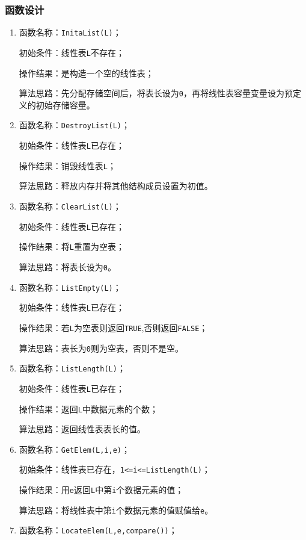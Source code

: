 \documentclass[supercite]{Experimental_Report}
\theoremstyle{definition}
\begin{document}
\subsubsection{函数设计}
\begin{enumerate}
\item 函数名称：\verb|InitaList(L)|；

初始条件：线性表\verb|L|不存在；

操作结果：是构造一个空的线性表；

算法思路：先分配存储空间后，将表长设为\verb|0|，再将线性表容量变量设为预定义的初始存储容量。

\item 函数名称：\verb|DestroyList(L)|；

初始条件：线性表\verb|L|已存在；

操作结果：销毁线性表\verb|L|；

算法思路：释放内存并将其他结构成员设置为初值。

\item 函数名称：\verb|ClearList(L)|；

初始条件：线性表\verb|L|已存在；

操作结果：将\verb|L|重置为空表；

算法思路：将表长设为\verb|0|。

\item 函数名称：\verb|ListEmpty(L)|；

初始条件：线性表\verb|L|已存在；

操作结果：若\verb|L|为空表则返回\verb|TRUE|,否则返回\verb|FALSE|；

算法思路：表长为\verb|0|则为空表，否则不是空。

\item 函数名称：\verb|ListLength(L)|；

初始条件：线性表\verb|L|已存在；

操作结果：返回\verb|L|中数据元素的个数；

算法思路：返回线性表表长的值。

\item 函数名称：\verb|GetElem(L,i,e)|；

初始条件：线性表已存在，\verb|1<=i<=ListLength(L)|；

操作结果：用\verb|e|返回\verb|L|中第\verb|i|个数据元素的值；

算法思路：将线性表中第\verb|i|个数据元素的值赋值给\verb|e|。

\item 函数名称：\verb|LocateElem(L,e,compare())|；


\end{enumerate}
\end{document}
